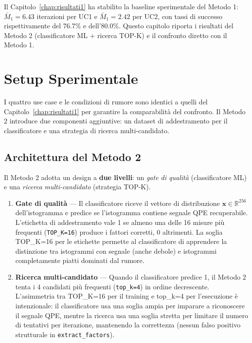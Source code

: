 \begin{onehalfspace}

Il Capitolo~\ref{chap:risultati1} ha stabilito la baseline sperimentale del Metodo 1: $\bar{M}_1 = 6.43$ iterazioni per UC1 e $\bar{M}_1 = 2.42$ per UC2, con tassi di successo rispettivamente del 76.7\% e dell'80.0\%. Questo capitolo riporta i risultati del Metodo 2 (classificatore \ac{ML} + ricerca TOP-K) e il confronto diretto con il Metodo 1.

\section{Setup Sperimentale}
\label{sec:setup_m2}

I quattro use case e le condizioni di rumore sono identici a quelli del Capitolo~\ref{chap:risultati1} per garantire la comparabilità del confronto. Il Metodo 2 introduce due componenti aggiuntive: un dataset di addestramento per il classificatore e una strategia di ricerca multi-candidato.

\subsection{Architettura del Metodo 2}

Il Metodo 2 adotta un design a \textbf{due livelli}: un \textit{gate di qualità} (classificatore \ac{ML}) e una \textit{ricerca multi-candidato} (strategia TOP-K).

\begin{enumerate}
    \item \textbf{Gate di qualità} — Il classificatore riceve il vettore di distribuzione $\mathbf{x} \in \mathbb{R}^{256}$ dell'istogramma e predice se l'istogramma contiene segnale \ac{QPE} recuperabile. L'etichetta di addestramento vale 1 se almeno una delle 16 misure più frequenti (\texttt{TOP\_K=16}) produce i fattori corretti, 0 altrimenti. La soglia TOP\_K=16 per le etichette permette al classificatore di apprendere la distinzione tra istogrammi con segnale (anche debole) e istogrammi completamente piatti dominati dal rumore.
    \item \textbf{Ricerca multi-candidato} — Quando il classificatore predice 1, il Metodo 2 tenta i 4 candidati più frequenti (\texttt{top\_k=4}) in ordine decrescente. L'asimmetria tra TOP\_K=16 per il training e top\_k=4 per l'esecuzione è intenzionale: il classificatore usa una soglia ampia per imparare a riconoscere il segnale QPE, mentre la ricerca usa una soglia stretta per limitare il numero di tentativi per iterazione, mantenendo la correttezza (nessun falso positivo strutturale in \texttt{extract\_factors}).
\end{enumerate}


\end{onehalfspace}
